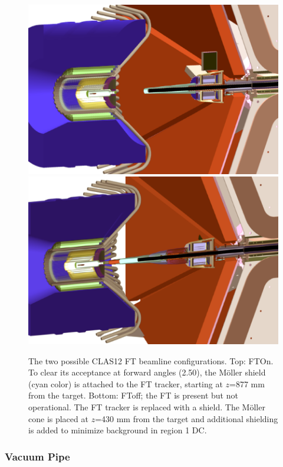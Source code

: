 \begin{figure}
	\centering
	\includegraphics[width=0.99\columnwidth,keepaspectratio]{img/ftOnGeometry.png}
	\includegraphics[width=0.99\columnwidth,keepaspectratio]{img/ftOffGeometry.png}
	\caption{The two possible CLAS12 FT beamline configurations. Top: FTOn. To clear its acceptance at forward angles (2.50\mdeg),
             the M\"oller shield (cyan color) is attached to the FT tracker, starting at $z$=877 mm from the target.
             Bottom: FToff; the FT is present but not operational. The FT tracker is replaced with a shield.
             The M\"oller cone is placed at $z$=430 mm from the target and additional shielding
             is added to minimize background in region 1 DC.}
	\label{fig:beamlineGeometry}
\end{figure}

\subsubsection{Vacuum Pipe}

